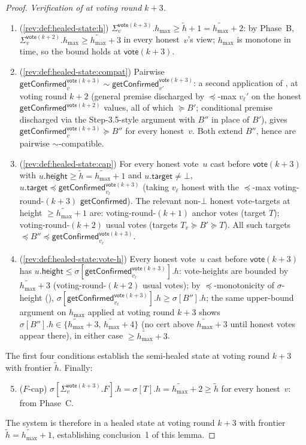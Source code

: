 \ifx\litemode\undefined\documentclass{article}\fi
\newcommand{\target}{\mathsf{target}}
\newcommand{\height}{\mathsf{height}}
\newcommand{\hmax}{\ensuremath{h_{\max}}\xspace}
\newcommand{\vote}{\ensuremath{\mathsf{vote}}}
\newcommand{\comm}[1]{\ensuremath{\widetilde{#1}}}
\newcommand{\getConfirmed}{\textsf{getConfirmed}\xspace}
\theoremstyle{plain}
\theoremstyle{definition}
\theoremstyle{remark}
\begin{document}
\begin{proof}
\medskip
\noindent\emph{Verification of  at voting round $k+3$.}
\begin{enumerate}
  \item (\ref{rev:def:healed-state:h}) $\Sigma_v^{\vote(k+3)}.\hmax \geq \comm{h}+1 = \comm{\hmax}+2$: by Phase~B, $\Sigma_v^{\vote(k+2)}.\hmax \geq \comm{\hmax}+3$ in every honest~$v$'s view; $\hmax$ is monotone in time, so the bound holds at $\vote(k+3)$.
  \item (\ref{rev:def:healed-state:compat}) Pairwise $\getConfirmed_v^{\vote(k+3)} \sim \getConfirmed_{v'}^{\vote(k+3)}$: a second application of , at voting round $k+2$ (general premise discharged by $\preceq$-max $v_\ell'$ on the honest $\getConfirmed^{\vote(k+2)}$ values, all of which $\succeq B'$; conditional premise discharged via the Step-3.5-style argument with $B''$ in place of $B'$), gives $\getConfirmed_v^{\vote(k+3)} \succeq B''$ for every honest~$v$. Both extend $B''$, hence are pairwise $\sim$-compatible.
  \item (\ref{rev:def:healed-state:cap}) For every honest vote~$u$ cast before $\vote(k+3)$ with $u.\height \geq \comm{h} = \comm{\hmax}+1$ and $u.\target \neq \bot$, $u.\target \preceq \getConfirmed_{v_\ell}^{\vote(k+3)}$ (taking $v_\ell$ honest with the $\preceq$-max voting-round-$(k+3)$ $\getConfirmed$). The relevant non-$\bot$ honest vote-targets at height $\geq \comm{\hmax}+1$ are: voting-round-$(k+1)$ anchor votes (target $T$); voting-round-$(k+2)$ usual votes (targets $T_v \succeq B' \succeq T$). All such targets $\preceq B'' \preceq \getConfirmed_{v_\ell}^{\vote(k+3)}$.
  \item (\ref{rev:def:healed-state:vote-h}) Every honest vote~$u$ cast before $\vote(k+3)$ has $u.\height \leq \sigma[\getConfirmed_{v_\ell}^{\vote(k+3)}].h$: vote-heights are bounded by $\comm{\hmax}+3$ (voting-round-$(k+2)$ usual votes); by $\preceq$-monotonicity of $\sigma$-height (), $\sigma[\getConfirmed_{v_\ell}^{\vote(k+3)}].h \geq \sigma[B''].h$; the same upper-bound argument on $\hmax$ applied at voting round $k+3$ shows $\sigma[B''].h \in \{\comm{\hmax}+3,\, \comm{\hmax}+4\}$ (no cert above $\comm{\hmax}+3$ until honest votes appear there), in either case $\geq \comm{\hmax}+3$.
\end{enumerate}
The first four conditions establish the semi-healed state at voting round $k+3$ with frontier $\comm{h}$. Finally:
\begin{enumerate}
\setcounter{enumi}{4}
  \item ($F$-cap) $\sigma[\Sigma_v^{\vote(k+3)}.F].h = \sigma[T].h = \comm{\hmax}+2 \geq \comm{h}$ for every honest~$v$: from Phase~C.
\end{enumerate}
The system is therefore in a healed state at voting round $k+3$ with frontier $\comm{h} = \comm{\hmax}+1$, establishing conclusion~1 of this lemma.


\end{proof}
\end{document}
